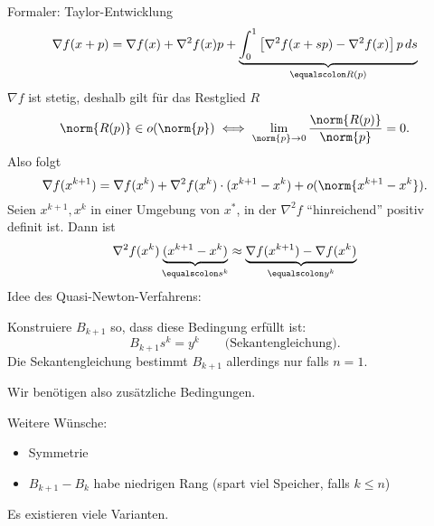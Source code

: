 Formaler: Taylor-Entwicklung
\begin{equation*}
 \nabla f(x+p)=\nabla f(x)+\nabla^2 f(x) p+\underbrace{\int_0^1 \left[ \nabla^2 f(x+sp)-\nabla^2 f(x) \right] p \,ds}_{\equalscolon R(p)}
\end{equation*}
$\nabla f$ ist stetig, deshalb gilt für das Restglied $R$
\begin{equation*}
 \norm{R(p)} \in o (\norm{p}) \iff \lim_{\norm{p} \to 0} \frac{\norm{R(p)}}{\norm{p}}=0.
\end{equation*}
Also folgt
\begin{equation*}
 \nabla f (x^{k+1} )=\nabla f (x^k )+\nabla^2 f (x^k ) \cdot (x^{k+1}-x^k )+o (\norm{x^{k+1}-x^k} ).
\end{equation*}
Seien $x^{k+1},x^k$ in einer Umgebung von $x^*$, in der $\nabla^2 f$ "`hinreichend"' positiv definit ist. Dann ist \begin{equation*}
  \nabla^2 f(x^k) \underbrace{(x^{k+1}-x^k)}_{\equalscolon s^k} \approx \underbrace{\nabla f(x^{k+1})-\nabla f(x^k)}_{\equalscolon y^k}
\end{equation*}
Idee des Quasi-Newton-Verfahrens:

Konstruiere $B_{k+1}$ so, dass diese Bedingung erfüllt ist:
\begin{equation*}
 B_{k+1}s^k=y^k
 \qquad
 \text{(Sekantengleichung)}.
\end{equation*}
Die Sekantengleichung bestimmt $B_{k+1}$ allerdings nur falls $n=1$.

\medskip

Wir benötigen also zusätzliche Bedingungen.

\medskip

Weitere Wünsche:
\begin{itemize}
	\item Symmetrie
	\item $B_{k+1}-B_k$ habe niedrigen Rang (spart viel Speicher, falls $k \leq n$)
\end{itemize}
Es existieren viele Varianten.

\medskip

